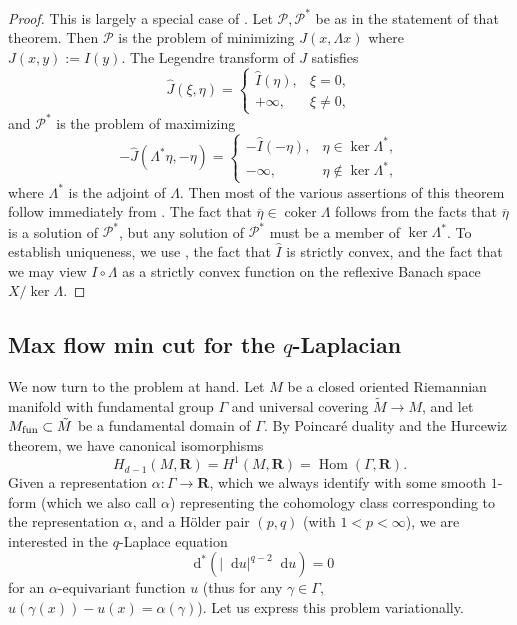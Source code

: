 \documentclass[reqno,11pt]{amsart}
\newcommand{\RR}{\mathbf{R}}
\newcommand*\dif{\mathop{}\!\mathrm{d}}
\DeclareMathOperator{\Hom}{Hom}
\DeclareMathOperator{\coker}{coker}
\theoremstyle{definition}
\numberwithin{equation}{section}
\begin{document}
\begin{proof}
This is largely a special case of \cite[Chapter IV, Theorem 4.2]{Ekeland99}.
Let $\mathscr P, \mathscr P^*$ be as in the statement of that theorem.
Then $\mathscr P$ is the problem of minimizing $J(x, \Lambda x)$ where $J(x, y) := I(y)$.
The Legendre transform of $J$ satisfies 
$$\hat J(\xi, \eta) = \begin{cases} \hat I(\eta), & \xi = 0, \\
	+\infty, &\xi \neq 0,
\end{cases}$$
and $\mathscr P^*$ is the problem of maximizing
$$-\hat J(\Lambda^* \eta, -\eta) = \begin{cases}
	-\hat I(-\eta), &\eta \in \ker \Lambda^*, \\
	-\infty, &\eta \notin \ker \Lambda^*,
\end{cases}$$
where $\Lambda^*$ is the adjoint of $\Lambda$.
Then most of the various assertions of this theorem follow immediately from \cite[Chapter IV, Theorem 4.2]{Ekeland99}.
The fact that $\overline \eta \in \coker \Lambda$ follows from the facts that $\overline \eta$ is a solution of $\mathscr P^*$, but any solution of $\mathscr P^*$ must be a member of $\ker \Lambda^*$. 
To establish uniqueness, we use \cite[Chapter II, Proposition 1.2]{Ekeland99}, the fact that $\hat I$ is strictly convex, and the fact that we may view $I \circ \Lambda$ as a strictly convex function on the reflexive Banach space $X/\ker \Lambda$.
\end{proof}


\subsection{Max flow min cut for the \texorpdfstring{$q$-Laplacian}{q-Laplacian}}
We now turn to the problem at hand.
Let $M$ be a closed oriented Riemannian manifold with fundamental group $\Gamma$ and universal covering $\tilde M \to M$, and let $M_{\rm fun} \subset \tilde M$ be a fundamental domain of $\Gamma$.
By Poincar\'e duality and the Hurcewiz theorem, we have canonical isomorphisms
\begin{equation}\label{Poincare Hurcewiz}
H_{d - 1}(M, \RR) = H^1(M, \RR) = \Hom(\Gamma, \RR).
\end{equation}
Given a representation $\alpha: \Gamma \to \RR$, which we always identify with some smooth $1$-form (which we also call $\alpha$) representing the cohomology class corresponding to the representation $\alpha$, and a H\"older pair $(p, q)$ (with $1 < p < \infty$),
we are interested in the $q$-Laplace equation
$$\dif^* (|\dif u|^{q - 2} \dif u) = 0$$
for an $\alpha$-equivariant function $u$ (thus for any $\gamma \in \Gamma$, $u(\gamma(x)) - u(x) = \alpha(\gamma)$).
Let us express this problem variationally.
\end{document}
